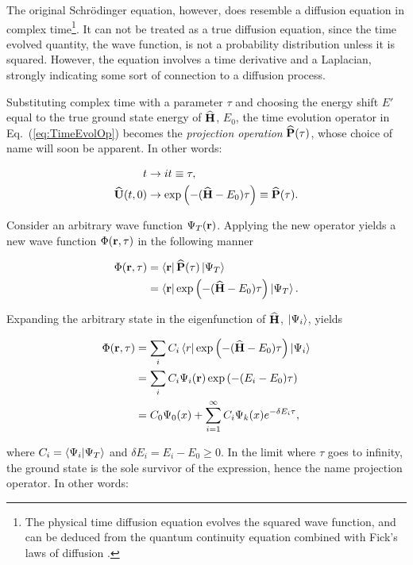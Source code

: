 The original Schrödinger equation, however, does resemble a diffusion equation in complex time\footnote{The physical time diffusion equation evolves the squared wave function, and can be deduced from the quantum continuity equation combined with Fick's laws of diffusion \cite{QMCDIFF}.}. It can not be treated as a true diffusion equation, since the time evolved quantity, the wave function, is not a probability distribution unless it is squared. However, the equation involves a time derivative and a Laplacian, strongly indicating some sort of connection to a diffusion process.

Substituting complex time with a parameter $\tau$ and choosing the energy shift $E'$ equal to the true ground state energy of ${\bf\widehat{H}}$, $E_0$, the time evolution operator in Eq.~(\ref{eq:TimeEvolOp}) becomes the \textit{projection operation} ${\bf\widehat{P}}(\tau)$, whose choice of name will soon be apparent. In other words:

\begin{align}
t &\to it \equiv \tau,\notag\\
{\bf\widehat{U}}(t, 0) &\to \exp\left(-({\bf\widehat{H}} - E_0)\tau\right) \equiv {\bf\widehat{P}}(\tau).\notag
\end{align}

Consider an arbitrary wave function $\Psi_T(\mathbf{r})$. Applying the new operator yields a new wave function $\Phi(\mathbf{r}, \tau)$ in the following manner

\begin{align}
 \Phi(\mathbf{r}, \tau) &= \left< \mathbf{r} \right|{\bf\widehat{P}}(\tau)\left| \Psi_T \right> \label{eq:projOPonTrial}\\
       &= \left< \mathbf{r} \right|\exp\left(-({\bf\widehat{H}} - E_0)\tau\right)\left| \Psi_T \right>. \notag
\end{align}

Expanding the arbitrary state in the eigenfunction of ${\bf\widehat{H}}$, $\left| \Psi_i \right>$, yields

\begin{align}
 \Phi(\mathbf{r}, \tau) &= \sum_iC_i\left< r \right|\exp\left(-({\bf\widehat{H}} - E_0)\tau\right)\left| \Psi_i \right>\notag \\
       &= \sum_iC_i\Psi_i(\mathbf{r})\exp\left(-(E_i - E_0)\tau\right) \notag \\
       &= C_0\Psi_0(x) + \sum_{i=1}^{\infty} C_i\Psi_k(x)e^{-\delta E_i\tau}, \label{eq:schrodGeneralSolution2}
\end{align}

where $C_i = \left\langle \Psi_i | \Psi_T\right\rangle$ and $\delta E_i = E_i - E_0 \ge 0$. In the limit where $\tau$ goes to infinity, the ground state is the sole survivor of the expression, hence the name projection operator. In other words:

